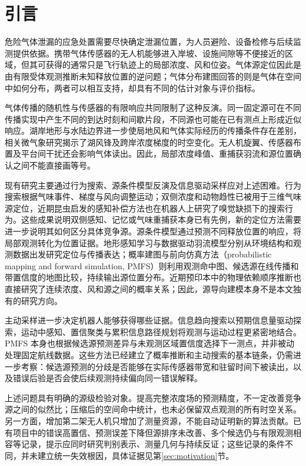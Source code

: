 \section{引言}
危险气体泄漏的应急处置需要尽快确定泄漏位置，为人员避险、设备检修与后续监测提供依据。携带气体传感器的无人机能够进入岸坡、设施间隙等不便接近的区域，但其可获得的通常只是飞行轨迹上的局部浓度、风和位姿。气体源定位因此是由有限受体观测推断未知释放位置的逆问题；气体分布建图回答的则是气体在空间中如何分布，两者可以相互支持，却具有不同的估计对象与评价指标。

气体传播的随机性与传感器的有限响应共同限制了这种反演。同一固定源可在不同传播实现中产生不同的到达时刻和间歇片段，不同源也可能在已有测点上形成近似响应。湖岸地形与水陆边界进一步使局地风和气体实际经历的传播条件存在差别，相关微气象研究揭示了湖风锋及跨岸浓度梯度的时空变化。无人机旋翼、传感器布置及平台间干扰还会影响气体读出。因此，局部浓度峰值、重捕获羽流和源位置确认之间不能直接画等号。

现有研究主要通过行为搜索、源条件模型反演及信息驱动采样应对上述困难。行为搜索根据气味事件、梯度与风向调整运动；双侧浓度和动物趋性已被用于三维气味源定位，近期昆虫启发的感知补偿方法也在机器人上研究了嗅觉缺损下的搜索行为。这些成果说明双侧感知、记忆或气味重捕获本身已有先例，新的定位方法需要进一步说明其如何区分具体竞争源。源条件模型通过预测不同释放位置的响应，将局部观测转化为位置证据。地形感知学习与数据驱动羽流模型分别从环境结构和观测数据出发研究定位与传播表达；概率建图与前向仿真方法（probabilistic mapping and forward simulation, PMFS）则利用观测命中图、候选源在线传播和带置信度的地图比较，持续输出源位置分布。近期预印本中的物理依赖顺序推断也直接研究了连续浓度、风和源之间的概率关系；因此，源导向建模本身不是本文独有的研究方向。

主动采样进一步决定机器人能够获得哪些证据。信息趋向搜索以预期信息量驱动探索，运动中感知、置信聚类与累积信息路径规划将观测与运动过程更紧密地结合。PMFS 本身也根据候选源预测差异与未观测区域置信度选择下一测点，并非被动处理固定航线数据。这些方法已经建立了概率推断和主动搜索的基本链条，仍需进一步考察：候选源预测的分歧是否能够在实际传感器带宽和驻留时间下被读出，以及错误后验是否会使后续观测持续偏向同一错误解释。

上述问题具有明确的源级检验对象。提高完整浓度场的预测精度，不一定改善竞争源之间的似然比；压缩后的空间命中统计，也未必保留双点观测的所有时空关系。另一方面，增加第二架无人机只增加了测量资源，不能自动证明新的算法贡献。已有项目中的错误高置信、预测误差下降但源排序未改善、多个候选仍与有限观测相容等记录，提示应同时研究判别表示、测量几何与持续反证；这些记录的条件不同，并未建立统一失效根因，具体证据见第\ref{sec:motivation}节。

